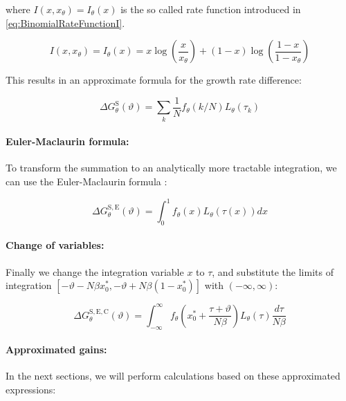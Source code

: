 \documentclass{article}
\theoremstyle{definition}
\begin{document}
where $I(x,x_\theta)=I_\theta(x)$ is the so called rate function introduced in \eqref{eq:BinomialRateFunctionI}.

\begin{equation}
    I(x,x_\theta) = I_\theta(x) = x \log \left ( \frac{x}{x_\theta} \right ) +
    (1-x) \log \left ( \frac{1-x}{1-x_\theta} \right )
\end{equation}

This results in an approximate formula for the growth rate difference:

\begin{equation}
    \Delta G_\theta^\mathrm{S}(\vartheta) = \sum_{k} \frac{1}{N} f_\theta(k/N) L_\theta(\tau_k)
\end{equation}


\paragraph{Euler-Maclaurin formula:}

To transform the summation to an analytically more tractable integration, we can use the Euler-Maclaurin formula \cite{paper:EulerMaclaurinFormula, paper:EulerMaclaurinFormula_Ostrowski}:

\begin{equation}
    \Delta G_\theta^\mathrm{S,E}(\vartheta) = \int_0^1 f_\theta(x) L_\theta(\tau(x)) dx
\end{equation}


\paragraph{Change of variables:}

Finally we change the integration variable $x$ to $\tau$, and substitute the limits of integration $[-\vartheta - N \beta x_0^*, -\vartheta + N \beta (1 - x_0^*)]$ with $(-\infty, \infty)$:

\begin{equation}
    \Delta G_\theta^\mathrm{S,E,C}(\vartheta) = \int_{-\infty}^\infty 
    f_\theta \left ( x_0^* + \frac{\tau + \vartheta}{N \beta} \right ) L_\theta(\tau) \frac{d\tau}{N \beta}
\end{equation}


\paragraph{Approximated gains:}

In the next sections, we will perform calculations based on these approximated expressions:
\end{document}
